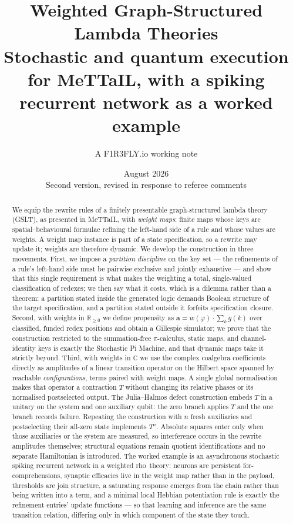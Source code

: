 \documentclass[11pt,a4paper]{article}
\title{\textbf{Weighted Graph-Structured Lambda Theories}\\[0.4em]
\large Stochastic and quantum execution for MeTTaIL, with a spiking\\
recurrent network as a worked example}
\author{A F1R3FLY.io working note}
\date{August 2026 \\[0.2em]\small Second version, revised in response to referee comments}
\theoremstyle{plain}
\theoremstyle{definition}
\theoremstyle{remark}
\newcommand{\rhoc}{\textsf{rho}}
\newcommand{\Rnn}{\mathbb{R}_{\geq 0}}
\newcommand{\Cx}{\mathbb{C}}
\newcommand{\prop}{\mathbf{a}}
\newcommand{\wmap}{w}
\newcommand{\gfac}{g}
\begin{document}
\maketitle

\begin{abstract}
We equip the rewrite rules of a finitely presentable graph-structured lambda theory (GSLT), as
presented in MeTTaIL, with \emph{weight maps}: finite maps whose keys are spatial--behavioural
formulae refining the left-hand side of a rule and whose values are weights. A weight map instance
is part of a state specification, so a rewrite may update it; weights are therefore dynamic. We
develop the construction in three movements. First, we impose a \emph{partition discipline} on the
key set --- the refinements of a rule's left-hand side must be pairwise exclusive and jointly
exhaustive --- and show that this single requirement is what makes the weighting a total,
single-valued classification of redexes; we then say what it costs, which is a dilemma rather than a
theorem: a partition stated inside the generated logic demands Boolean structure of the target
specification, and a partition stated outside it forfeits specification closure. Second, with
weights in $\Rnn$ we define propensity as $\prop = \wmap(\varphi)\cdot\sum_k \gfac(k)$ over
classified, funded redex positions and obtain a Gillespie simulator; we prove that the construction
restricted to the summation-free $\pi$-calculus, static maps, and channel-identity keys is exactly
the Stochastic Pi Machine, and that dynamic maps take it strictly beyond. Third, with weights in
$\Cx$ we use the complex coalgebra coefficients directly as amplitudes of a linear transition
operator on the Hilbert space spanned by reachable \emph{configurations}, terms paired with weight
maps. A single global normalisation makes that operator a contraction $T$ without changing its
relative phases or its normalised postselected output. The Julia--Halmos defect construction embeds
$T$ in a unitary on the system and one auxiliary qubit: the zero branch applies $T$ and the one branch
records failure. Repeating the construction with $n$ fresh auxiliaries and postselecting their
all-zero state implements $T^n$. Absolute squares enter only when those auxiliaries or the system are
measured, so interference occurs in the rewrite amplitudes themselves; structural equations remain
quotient identifications and no separate Hamiltonian is introduced. The
worked example is an asynchronous stochastic spiking recurrent network in a weighted \rhoc\ theory:
neurons are persistent for-comprehensions, synaptic efficacies live in the weight map rather than in
the payload, thresholds are join structure, a saturating response emerges from the chain rather than
being written into a term, and a minimal local Hebbian potentiation rule is exactly the refinement
entries' update functions --- so that learning and inference are the same transition relation,
differing only in which component of the state they touch.
\end{abstract}
\end{document}
